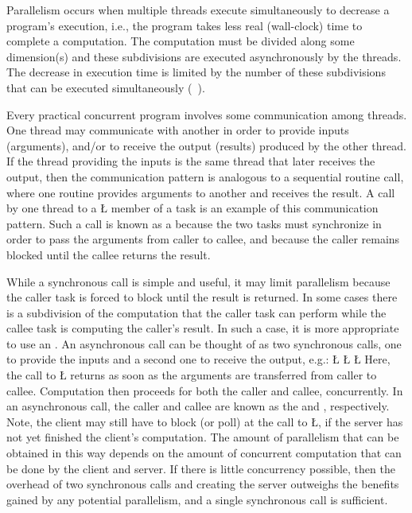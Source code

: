 \documentclass[openright,twoside]{report}
\begin{document}
Parallelism occurs when multiple threads execute simultaneously to decrease a program's execution, i.e., the program takes less real (wall-clock) time to complete a computation.
The computation must be divided along some dimension(s) and these subdivisions are executed asynchronously by the threads.
The decrease in execution time is limited by the number of these subdivisions that can be executed simultaneously (~\cite{Amdahl67}).

Every practical concurrent program involves some communication among threads.
One thread may communicate with another in order to provide inputs (arguments), and/or to receive the output (results) produced by the other thread.
If the thread providing the inputs is the same thread that later receives the output, then the communication pattern is analogous to a sequential routine call, where one routine provides arguments to another and receives the result.
A call by one thread to a \LGinlinetrue\LGbegin\lgrinde\L{}\endlgrinde\LGend{} member of a task is an example of this communication pattern.
Such a call is known as a  because the two tasks must synchronize in order to pass the arguments from caller to callee, and because the caller remains blocked until the callee returns the result.

While a synchronous call is simple and useful, it may limit parallelism because the caller task is forced to block until the result is returned.
In some cases there is a subdivision of the computation that the caller task can perform while the callee task is computing the caller's result.
In such a case, it is more appropriate to use an .
An asynchronous call can be thought of as two synchronous calls, one to provide the inputs and a second one to receive the output, e.g.:
\LGinlinefalse\LGbegin\lgrinde
\L{}
\CE{}\L{}
\CE{}\L{}
\CE{}\endlgrinde\LGend
Here, the call to \LGinlinetrue\LGbegin\lgrinde\L{}\endlgrinde\LGend{} returns as soon as the arguments are transferred from caller to callee.
Computation then proceeds for both the caller and callee, concurrently.
In an asynchronous call, the caller and callee are known as the  and , respectively.
Note, the client may still have to block (or poll) at the call to \LGinlinetrue\LGbegin\lgrinde\L{}\endlgrinde\LGend{}, if the server has not yet finished the client's computation.
The amount of parallelism that can be obtained in this way depends on the amount of concurrent computation that can be done by the client and server.
If there is little concurrency possible, then the overhead of two synchronous calls and creating the server outweighs the benefits gained by any potential parallelism, and a single synchronous call is sufficient.
\end{document}

